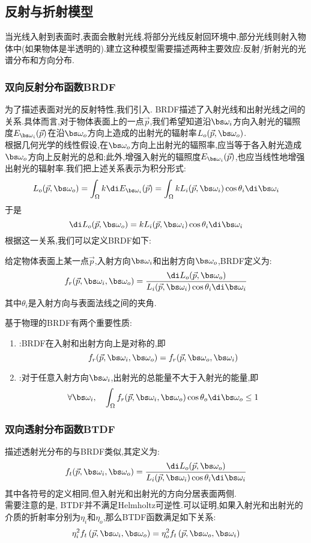 \documentclass{ctexart}
\begin{document}
\subsection{反射与折射模型}
当光线入射到表面时,表面会散射光线,将部分光线反射回环境中,部分光线则射入物体中(如果物体是半透明的).建立这种模型需要描述两种主要效应:反射/折射光的光谱分布和方向分布.
\subsubsection{双向反射分布函数BRDF}
为了描述表面对光的反射特性,我们引入. BRDF描述了入射光线和出射光线之间的关系.具体而言,对于物体表面上的一点$\vec{p}$,我们希望知道沿$\bs\omega_i$方向入射光的辐照度$E_{\bs\omega_i}(\vec{p})$在沿$\bs\omega_o$方向上造成的出射光的辐射率$L_o(\vec{p},\bs\omega_o)$.\\
\indent 根据几何光学的线性假设,在$\bs\omega_o$方向上出射光的辐照率,应当等于各入射光造成$\bs\omega_o$方向上反射光的总和;此外,增强入射光的辐照度$E_{\bs\omega_i}(\vec{p})$,也应当线性地增强出射光的辐射率.我们把上述关系表示为积分形式:
\[L_o(\vec{p},\bs\omega_o)=\int_{\Omega}k\di E_{\bs\omega_i}(\vec{p})=\int_{\Omega}kL_i(\vec{p},\bs\omega_i)\cos\theta_i\di\bs\omega_i\]
于是
\[\di L_o(\vec{p},\bs\omega_o)=kL_i(\vec{p},\bs\omega_i)\cos\theta_i\di\bs\omega_i\]
根据这一关系,我们可以定义BRDF如下:
\begin{definition}[双向反射分布函数]
    给定物体表面上某一点$\vec{p}$,入射方向$\bs\omega_i$和出射方向$\bs\omega_o$,BRDF定义为:
    \[f_r(\vec{p},\bs\omega_i,\bs\omega_o)=\dfrac{\di L_o(\vec{p},\bs\omega_o)}{L_i(\vec{p},\bs\omega_i)\cos\theta_i\di\bs\omega_i}\]
    其中$\theta_i$是入射方向与表面法线之间的夹角.
\end{definition}
基于物理的BRDF有两个重要性质:
\begin{theorem}[BRDF的性质]
    \begin{enumerate}
        \item {}:BRDF在入射和出射方向上是对称的,即
        \[f_r(\vec{p},\bs\omega_i,\bs\omega_o)=f_r(\vec{p},\bs\omega_o,\bs\omega_i)\]
        \item {}:对于任意入射方向$\bs\omega_i$,出射光的总能量不大于入射光的能量,即
        \[\forall \bs\omega_i,\quad\int_{\Omega}f_r(\vec{p},\bs\omega_i,\bs\omega_o)\cos\theta_o\di\bs\omega_o\leq 1\]
    \end{enumerate}
\end{theorem}
\subsubsection{双向透射分布函数BTDF}
描述透射光分布的与BRDF类似,其定义为:
\[f_t(\vec{p},\bs\omega_i,\bs\omega_o)=\dfrac{\di L_o(\vec{p},\bs\omega_o)}{L_i(\vec{p},\bs\omega_i)\cos\theta_i\di\bs\omega_i}\]
其中各符号的定义相同,但入射光和出射光的方向分居表面两侧.\\
\indent 需要注意的是, BTDF并不满足Helmholtz可逆性.可以证明,如果入射光和出射光的介质的折射率分别为$\eta_i$和$\eta_o$,那么BTDF函数满足如下关系:
\[\eta_i^2f_t\left(\vec{p},\bs\omega_i,\bs\omega_o\right)=\eta_o^2f_t\left(\vec{p},\bs\omega_o,\bs\omega_i\right)\]
\end{document}
